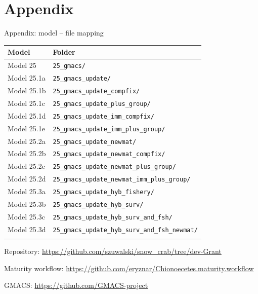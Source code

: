 \documentclass[
  10pt,
  ignorenonframetext,
  aspectratio=169,
]{beamer}
\begin{document}
\section{Appendix}\label{appendix}

\begin{frame}[fragile]{Appendix: model -- file mapping}
\label{appendix-model-file-mapping}
\tiny

\begin{longtable}[]{@{}ll@{}}
\toprule\noalign{}
Model & Folder \\
\midrule\noalign{}
\endhead
Model 25 & \texttt{25\_gmacs/} \\
Model 25.1a & \texttt{25\_gmacs\_update/} \\
Model 25.1b & \texttt{25\_gmacs\_update\_compfix/} \\
Model 25.1c & \texttt{25\_gmacs\_update\_plus\_group/} \\
Model 25.1d & \texttt{25\_gmacs\_update\_imm\_compfix/} \\
Model 25.1e & \texttt{25\_gmacs\_update\_imm\_plus\_group/} \\
Model 25.2a & \texttt{25\_gmacs\_update\_newmat/} \\
Model 25.2b & \texttt{25\_gmacs\_update\_newmat\_compfix/} \\
Model 25.2c & \texttt{25\_gmacs\_update\_newmat\_plus\_group/} \\
Model 25.2d & \texttt{25\_gmacs\_update\_newmat\_imm\_plus\_group/} \\
Model 25.3a & \texttt{25\_gmacs\_update\_hyb\_fishery/} \\
Model 25.3b & \texttt{25\_gmacs\_update\_hyb\_surv/} \\
Model 25.3c & \texttt{25\_gmacs\_update\_hyb\_surv\_and\_fsh/} \\
Model 25.3d &
\texttt{25\_gmacs\_update\_hyb\_surv\_and\_fsh\_newmat/} \\
\bottomrule\noalign{}
\end{longtable}

\medskip

\scriptsize Repository:
\url{https://github.com/szuwalski/snow_crab/tree/dev-Grant}

Maturity workflow:
\url{https://github.com/eryznar/Chionoecetes.maturity.workflow}

GMACS: \url{https://github.com/GMACS-project}
\end{frame}
\end{document}

